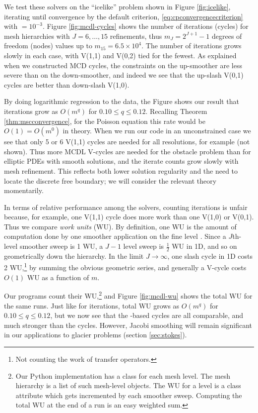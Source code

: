 \documentclass[letterpaper,final,12pt,reqno]{amsart}
\theoremstyle{claim}
\numberwithin{equation}{section}
\numberwithin{figure}{section}
\numberwithin{table}{section}
\numberwithin{theorem}{section}
\begin{document}
We test these solvers on the ``icelike'' problem shown in Figure \ref{fig:icelike}, iterating until convergence by the default criterion, \eqref{eq:cpconvergencecriterion} with  $=10^{-3}$.  Figure \ref{fig:mcdl-cycles} shows the number of iterations (cycles) for mesh hierarchies with $J=6,\dots,15$ refinements, thus $m_J=2^{J+1}-1$ degrees of freedom (nodes) values up to $m_{15}=6.5 \times 10^4$.  The number of iterations grows slowly in each case, with V(1,1) and V(0,2) tied for the fewest.  As explained when we constructed MCD cycles, the constraints on the up-smoother are less severe than on the down-smoother, and indeed we see that the up-slash V(0,1) cycles are better than down-slash V(1,0).

By doing logarithmic regression to the data, the Figure shows our result that iterations grow as $O(m^q)$ for $0.10 \le q \le 0.12$.  Recalling Theorem \ref{thm:mscconvergence}, for the Poisson equation this rate would be $O(1) = O(m^0)$ in theory.  When we run our code in an unconstrained case we see that only 5 or 6 V(1,1) cycles are needed for all resolutions, for example (not shown).  Thus more MCDL V-cycles are needed for the obstacle problem than for elliptic PDEs with smooth solutions, and the iterate counts grow slowly with mesh refinement.  This reflects both lower solution regularity and the need to locate the discrete free boundary; we will consider the relevant theory momentarily.

In terms of relative performance among the solvers, counting iterations is unfair because, for example, one V(1,1) cycle does more work than one V(1,0) or V(0,1).  Thus we compare \emph{work units} (WU).  By definition, one WU is the amount of computation done by one smoother application on the fine level \cite{Briggsetal2000}.  Since a $J$th-level smoother sweep is 1 WU, a $J-1$ level sweep is $\frac{1}{2}$ WU in 1D, and so on geometrically down the hierarchy.  In the limit $J\to\infty$, one slash cycle in 1D costs 2 WU,\footnote{Not counting the work of transfer operators.} by summing the obvious geometric series, and generally a V-cycle costs $O(1)$ WU as a function of $m$.

Our programs count their WU,\footnote{Our Python implementation has a class for each mesh level.  The mesh hierarchy is a list of such mesh-level objects.  The WU for a level is a class attribute which gets incremented by each smoother sweep.  Computing the total WU at the end of a run is an easy weighted sum.} and Figure \ref{fig:mcdl-wu} shows the total WU for the same runs.  Just like for iterations, total WU grows as $O(m^q)$ for $0.10 \le q \le 0.12$, but we now see that the -based cycles are all comparable, and much stronger than the  cycles.  However, Jacobi smoothing will remain significant in our applications to glacier problems (section \ref{sec:stokes}).
\end{document}
